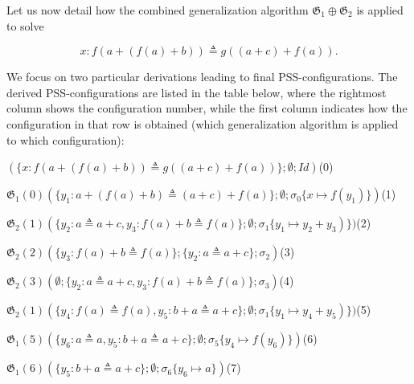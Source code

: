  
 
Let us now detail how the combined generalization algorithm $\mathfrak{G}_{1}\oplus\mathfrak{G}_{2}$ is applied to solve\par
  
\par  \quad  \[x:f(a+(f(a)+b))\triangleq g((a+c)+f(a)).\]\quad  \quad  
  
We focus on two particular derivations leading to final PSS-configurations. The derived PSS-configurations are listed in the table below, where the rightmost column shows the configuration number, while the first column indicates how the configuration in that row is obtained (which generalization algorithm is applied to which configuration):\par
 
 
   
\par  \quad  $(\{x:f(a+(f(a)+b))\triangleq g((a+c)+f(a))\};\emptyset;\mathit{Id})$\quad  (0)\quad  
 
\par  $\mathfrak{G}_{1}(0)$\quad  $(\{y_{1}:a+(f(a)+b)\triangleq(a+c)+f(a)\};\emptyset;\sigma_{0}\{x\mapsto f(y_{1})\})$\quad  (1)\quad  
 
\par  $\mathfrak{G}_{2}(1)$\quad  $(\{y_{2}:a\triangleq a+c,y_{3}:f(a)+b\triangleq f(a)\};\emptyset;\sigma_{1}\{y_{1}\mapsto y_{2}+y_{3})\})$\quad  (2)\quad  
 
\par  $\mathfrak{G}_{2}(2)$\quad  $(\{y_{3}:f(a)+b\triangleq f(a)\};\{y_{2}:a\triangleq a+c\};\sigma_{2})$\quad  (3)\quad  
 
\par  $\mathfrak{G}_{2}(3)$\quad  $(\emptyset;\{y_{2}:a\triangleq a+c,y_{3}:f(a)+b\triangleq f(a)\};\sigma_{3})$\quad  (4)\quad  
 
\par  $\mathfrak{G}_{2}(1)$\quad  $(\{y_{4}:f(a)\triangleq f(a),y_{5}:b+a\triangleq a+c\};\emptyset;\sigma_{1}\{y_{1}\mapsto y_{4}+y_{5})\})$\quad  (5)\quad  
 
\par  $\mathfrak{G}_{1}(5)$\quad  $(\{y_{6}:a\triangleq a,y_{5}:b+a\triangleq a+c\};\emptyset;\sigma_{5}\{y_{4}\mapsto f(y_{6})\})$\quad  (6)\quad  
 
\par  $\mathfrak{G}_{1}(6)$\quad  $(\{y_{5}:b+a\triangleq a+c\};\emptyset;\sigma_{6}\{y_{6}\mapsto a\})$\quad  (7)\quad  
 
